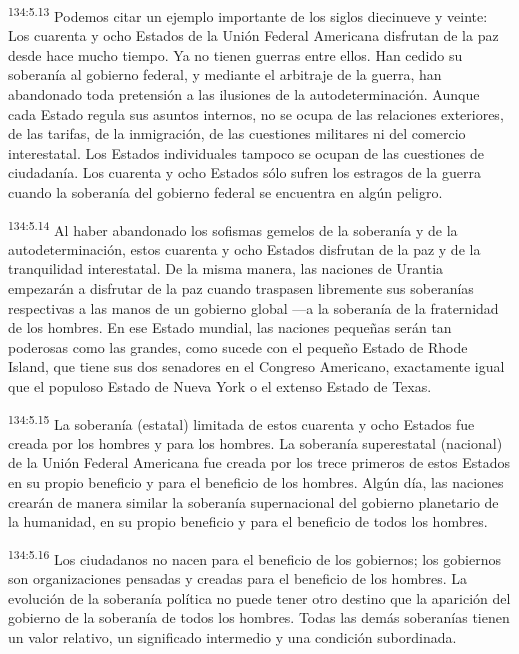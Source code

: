 \par 
\textsuperscript{134:5.13} Podemos citar un ejemplo importante de los siglos diecinueve y veinte: Los cuarenta y ocho Estados de la Unión Federal Americana disfrutan de la paz desde hace mucho tiempo. Ya no tienen guerras entre ellos. Han cedido su soberanía al gobierno federal, y mediante el arbitraje de la guerra, han abandonado toda pretensión a las ilusiones de la autodeterminación. Aunque cada Estado regula sus asuntos internos, no se ocupa de las relaciones exteriores, de las tarifas, de la inmigración, de las cuestiones militares ni del comercio interestatal. Los Estados individuales tampoco se ocupan de las cuestiones de ciudadanía. Los cuarenta y ocho Estados sólo sufren los estragos de la guerra cuando la soberanía del gobierno federal se encuentra en algún peligro.

\par 
\textsuperscript{134:5.14} Al haber abandonado los sofismas gemelos de la soberanía y de la autodeterminación, estos cuarenta y ocho Estados disfrutan de la paz y de la tranquilidad interestatal. De la misma manera, las naciones de Urantia empezarán a disfrutar de la paz cuando traspasen libremente sus soberanías respectivas a las manos de un gobierno global ---a la soberanía de la fraternidad de los hombres. En ese Estado mundial, las naciones pequeñas serán tan poderosas como las grandes, como sucede con el pequeño Estado de Rhode Island, que tiene sus dos senadores en el Congreso Americano, exactamente igual que el populoso Estado de Nueva York o el extenso Estado de Texas.

\par 
\textsuperscript{134:5.15} La soberanía (estatal) limitada de estos cuarenta y ocho Estados fue creada por los hombres y para los hombres. La soberanía superestatal (nacional) de la Unión Federal Americana fue creada por los trece primeros de estos Estados en su propio beneficio y para el beneficio de los hombres. Algún día, las naciones crearán de manera similar la soberanía supernacional del gobierno planetario de la humanidad, en su propio beneficio y para el beneficio de todos los hombres.

\par 
\textsuperscript{134:5.16} Los ciudadanos no nacen para el beneficio de los gobiernos; los gobiernos son organizaciones pensadas y creadas para el beneficio de los hombres. La evolución de la soberanía política no puede tener otro destino que la aparición del gobierno de la soberanía de todos los hombres. Todas las demás soberanías tienen un valor relativo, un significado intermedio y una condición subordinada.

